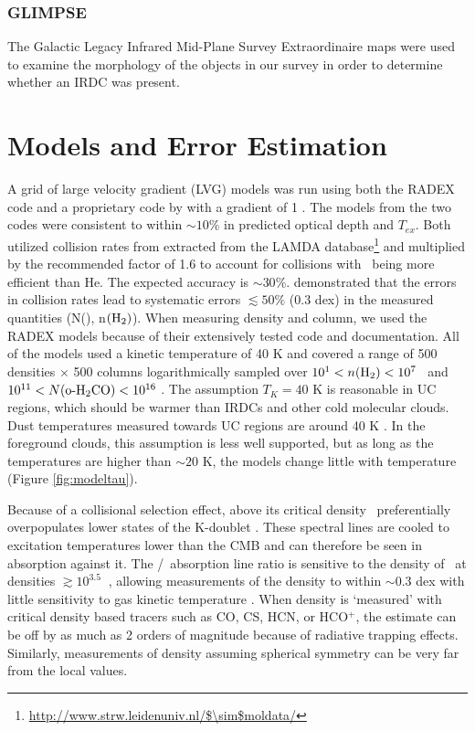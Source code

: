 \subsubsection{GLIMPSE}
The Galactic Legacy Infrared Mid-Plane Survey Extraordinaire
\citep[GLIMPSE]{Benjamin2003} maps were used to examine the morphology of the
objects in our survey in order to determine whether an IRDC was present.

\section{Models and Error Estimation}
\label{sec:models}
A grid of large velocity gradient (LVG) models was run using both the RADEX
\citep{VanDerTak2007} code and a proprietary code by \citet{henkel1980} with a 
gradient of 1 \kmspc.  The
models from the two codes were consistent to within $\sim10\%$ in predicted
optical depth and $T_{ex}$.  Both utilized collision
rates from \citet{Green1991} extracted from the LAMDA
database\footnote{\url{http://www.strw.leidenuniv.nl/$\sim$moldata/}} and multiplied by
the recommended factor of 1.6 to account for collisions with \hh\ being more
efficient than He.  The expected accuracy is $\sim30\%$.
\citet{Zeiger2010} demonstrated that the errors in collision rates lead to
systematic errors $\lesssim50\%$  (0.3 dex) in the measured quantities
(N(\formaldehyde), n$(\textrm{H}_{2})$).  When measuring density and column, we used the
RADEX models because of their extensively tested code and documentation.  All of the
models used a kinetic temperature of 40 K and covered a range of 500 densities
$\times$ 500 columns logarithmically sampled over $10^1 < n(\textrm{H}_{2}) < 10^7$ \percc\
and $10^{11} < N(\textrm{o-H}_2\textrm{CO}) < 10^{16} $ \persc.  The assumption $T_K=40$ K is
reasonable in UC regions, which should be warmer than IRDCs and other
cold molecular clouds.  Dust temperatures measured towards UC\ion{H}{2}
regions are around 40 K \citep{Rivera2010}.  In the foreground clouds, this
assumption is less well supported, but as long as the temperatures are higher
than $\sim20$ K, the models change little with temperature (Figure
\ref{fig:modeltau}).

Because of a collisional selection effect, above its critical density
\citep[$n_{cr}(\formaldehyde\ \oneone)\approx 8\ \percc$, \ensuremath{n_{cr}(\formaldehyde\ 
\twotwo) \approx 76\ \percc}, ][]{Mangum2008}
\formaldehyde\ preferentially overpopulates lower states of the K-doublet
\citep[$\Delta$J =0, $\Delta K_a=0$, $\Delta K_c = \pm1$,][]{henkel1980}.  These
spectral lines are cooled to excitation temperatures lower than the CMB and can
therefore be seen in absorption against it.  The \oneone/\twotwo\
absorption line ratio is sensitive to the density of \hh\ at densities
$\gtrsim10^{3.5}\ $ \percc, allowing measurements of the density to within
$\sim$0.3 dex with little sensitivity to gas kinetic temperature
\citep{Mangum2008}.  When density is `measured' with critical density based
tracers such as CO, CS, HCN, or HCO$^+$, the estimate can be off by as much as
2 orders of magnitude because of radiative trapping effects.  Similarly,
measurements of density assuming spherical symmetry can be very far from the
local values.

